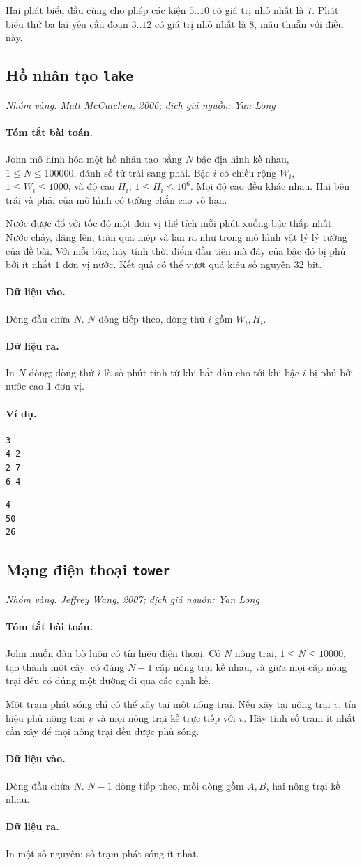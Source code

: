 \documentclass[11pt]{article}
\newcommand{\problem}[4]{%
  \subsection[#1 (#2)]{#1 \hfill {\normalsize\texttt{#2}}}%
  \noindent\textit{#3. #4}\par\smallskip
}
\newcommand{\iosec}[1]{\paragraph{#1}}
\begin{document}
Hai phát biểu đầu cùng cho phép các kiện \(5..10\) có giá trị nhỏ nhất là
\(7\). Phát biểu thứ ba lại yêu cầu đoạn \(3..12\) có giá trị nhỏ nhất là
\(8\), mâu thuẫn với điều này.

\problem{Hồ nhân tạo}{lake}{Nhóm vàng}{Matt McCutchen, 2006; dịch giả nguồn: Yan Long}

\iosec{Tóm tắt bài toán.}
John mô hình hóa một hồ nhân tạo bằng \(N\) bậc địa hình kề nhau,
\(1\le N\le 100000\), đánh số từ trái sang phải. Bậc \(i\) có chiều rộng
\(W_i\), \(1\le W_i\le 1000\), và độ cao \(H_i\),
\(1\le H_i\le 10^6\). Mọi độ cao đều khác nhau. Hai bên trái và phải của mô
hình có tường chắn cao vô hạn.

Nước được đổ với tốc độ một đơn vị thể tích mỗi phút xuống bậc thấp nhất.
Nước chảy, dâng lên, tràn qua mép và lan ra như trong mô hình vật lý lý tưởng
của đề bài. Với mỗi bậc, hãy tính thời điểm đầu tiên mà đáy của bậc đó bị phủ
bởi ít nhất \(1\) đơn vị nước. Kết quả có thể vượt quá kiểu số nguyên 32 bit.

\iosec{Dữ liệu vào.}
Dòng đầu chứa \(N\). \(N\) dòng tiếp theo, dòng thứ \(i\) gồm \(W_i,H_i\).

\iosec{Dữ liệu ra.}
In \(N\) dòng; dòng thứ \(i\) là số phút tính từ khi bắt đầu cho tới khi bậc
\(i\) bị phủ bởi nước cao \(1\) đơn vị.

\iosec{Ví dụ.}
\begin{verbatim}
3
4 2
2 7
6 4
\end{verbatim}

\begin{verbatim}
4
50
26
\end{verbatim}

\problem{Mạng điện thoại}{tower}{Nhóm vàng}{Jeffrey Wang, 2007; dịch giả nguồn: Yan Long}

\iosec{Tóm tắt bài toán.}
John muốn đàn bò luôn có tín hiệu điện thoại. Có \(N\) nông trại,
\(1\le N\le 10000\), tạo thành một cây: có đúng \(N-1\) cặp nông trại kề
nhau, và giữa mọi cặp nông trại đều có đúng một đường đi qua các cạnh kề.

Một trạm phát sóng chỉ có thể xây tại một nông trại. Nếu xây tại nông trại
\(v\), tín hiệu phủ nông trại \(v\) và mọi nông trại kề trực tiếp với \(v\).
Hãy tính số trạm ít nhất cần xây để mọi nông trại đều được phủ sóng.

\iosec{Dữ liệu vào.}
Dòng đầu chứa \(N\). \(N-1\) dòng tiếp theo, mỗi dòng gồm \(A,B\), hai nông
trại kề nhau.

\iosec{Dữ liệu ra.}
In một số nguyên: số trạm phát sóng ít nhất.
\end{document}

